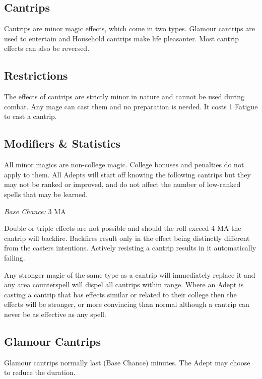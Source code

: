 \begin{multicols*}{3}
\section{Cantrips}

Cantrips are minor magic effects, which come in two types. Glamour
cantrips are used to entertain and Household cantrips make life
pleasanter. Most cantrip effects can also be reversed.

\subsection{Restrictions}

The effects of cantrips are strictly minor in nature and cannot be
used during combat. Any mage can cast them and no preparation is
needed.  It costs 1 Fatigue to cast a cantrip.

\subsection{Modifiers \& Statistics}

All minor magics are non-college magic. College bonuses and penalties
do not apply to them. All Adepts will start off knowing the following
cantrips but they may not be ranked or improved, and do not affect the
number of low-ranked spells that may be learned.

\emph{Base Chance:} 3 \x MA 

Double or triple effects are not possible and should the roll exceed 4
\x MA the cantrip will backfire. Backfires result only in the effect
being distinctly different from the casters intentions. Actively
resisting a cantrip results in it automatically failing.

Any stronger magic of the same type as a cantrip will immediately
replace it and any area counterspell will dispel all cantrips within
range.  Where an Adept is casting a cantrip that has effects similar
or related to their college then the effects will be stronger, or more
convincing than normal although a cantrip can never be as effective as
any spell.

\subsection{Glamour Cantrips}

Glamour cantrips normally last (Base Chance) minutes.  The Adept may
choose to reduce the duration.
\begin{Description}


\end{Description}
\end{multicols*}
